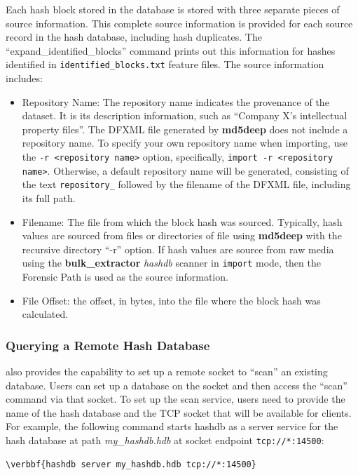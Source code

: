 \documentclass[11pt,fleqn]{article} %
\begin{document}
Each hash block stored in the database is stored with three separate pieces of source information. This complete source information is provided for each source record in the hash database, including hash duplicates. The ``expand\_identified\_blocks'' command prints out this information for hashes identified in \texttt{identified\_blocks.txt} feature files. The source information includes:
\begin{itemize}
\item Repository Name:
The repository name indicates the provenance of the dataset.
It is its description information,
such as ``Company X's intellectual property files''.
The DFXML file generated by \textbf{md5deep} does not include a repository name.
To specify your own repository name when importing,
use the \texttt{-r <repository name>} option,
specifically, \texttt{import -r <repository name>}.
Otherwise, a default repository name will be generated,
consisting of the text \texttt{repository\_}
followed by the filename of the DFXML file, including its full path.
\item Filename: The file from which the block hash was sourced. Typically, hash values are sourced from files or directories of file using \textbf{md5deep} with the recursive directory ``-r'' option. If hash values are source from raw media using the \textbf{bulk\_extractor} \textit{hashdb} scanner in \texttt{import} mode, then the Forensic Path is used as the source information.
\item File Offset: the offset, in bytes, into the file where the block hash was calculated.
\end{itemize}

\subsubsection{Querying a Remote Hash Database}
\hash also provides the capability to set up a remote socket to ``scan'' an existing database. Users can set up a database on the socket and then access the ``scan'' command via that socket. To set up the scan service, users need to provide the name of the hash database and the TCP socket that will be available for clients.
For example, the following command
starts hashdb as a server service for the hash database at path \textit{my\_hashdb.hdb} at socket endpoint \texttt{tcp://*:14500}:
 \begin{Verbatim}[commandchars=\\\{\}]
\verbbf{hashdb server my_hashdb.hdb tcp://*:14500}
\end{Verbatim} 
\end{document}
